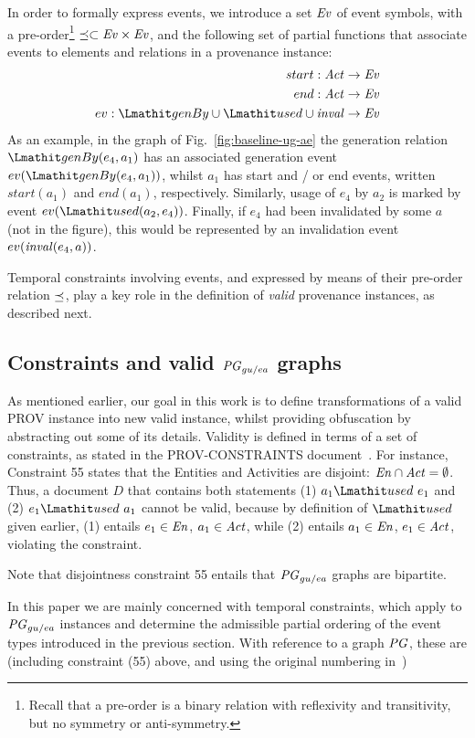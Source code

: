 In order to formally express events, we introduce a set $\mathit{Ev}$ of event symbols, with a pre-order\footnote{Recall that a pre-order is a binary relation with reflexivity and transitivity, but no symmetry or anti-symmetry.} $\preceq \subset \mathit{Ev} \times \mathit{Ev}$, and the following set of partial functions that associate events to elements and relations in a provenance instance:
\begin{align*}
start: \act \rightarrow \Ev \\
end: \act \rightarrow \Ev \\
ev: \wgby \cup \used \cup \inv \rightarrow \Ev
\end{align*}	
As an example, in the graph of Fig.~\ref{fig:baseline-ug-ae} the generation relation $\wgby(e_4, a_1)$ has an associated generation event $ev(\wgby(e_4, a_1))$, whilst $a_1$ has start and / or end events, written $start(a_1)$ and $end(a_1)$, respectively. Similarly, usage of $e_4$ by $a_2$ is marked by event $ev(\used(a_2, e_4))$. Finally, if $e_4$ had been invalidated by some $a$ (not in the figure), this would be represented by an invalidation event $ev(\mathit{inval}(e_4,a))$.

Temporal constraints involving events, and expressed by means of their pre-order relation $\preceq$, play a key role in the definition of \textit{valid} provenance instances, as described next.

\subsection{Constraints and valid $\mathit{PG}_{gu/ea}$ graphs}
\label{sec:prov-constraints}

As mentioned earlier, our goal in this work is to define transformations of a valid PROV instance into new valid instance, whilst providing obfuscation by abstracting out some of its details. Validity is defined in terms of a set of constraints, as stated in the PROV-CONSTRAINTS document~\citep{w3c-prov-constraints}.
%
For instance, Constraint 55 states that the Entities and Activities are disjoint:  $\mathit{En} \cap \mathit{Act} = \emptyset$.
Thus, a document $D$ that contains both statements (1) $a_1 \used~e_1$ and (2) $e_1 \used ~a_1$ cannot be valid, because by definition of $\used$ given earlier, (1) entails 
$e_1 \in \mathit{En}$, $a_1 \in \mathit{Act}$, while (2) entails $a_1 \in \mathit{En}$, $e_1 \in \mathit{Act}$, violating the constraint.

Note that disjointness constraint 55 entails that $\mathit{PG}_{gu/ea}$ graphs are bipartite.

In this paper we are mainly concerned with temporal constraints, which apply to $\mathit{PG}_{gu/ea}$ instances and determine the admissible partial ordering of the event types introduced in the previous section.
With reference to a graph $\mathit{PG}$, these are (including constraint (55) above, and using the original numbering in~\citep{w3c-prov-constraints})

